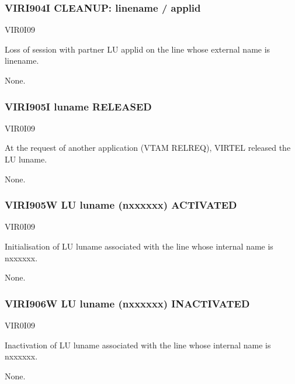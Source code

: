 \documentclass[letterpaper,10pt,english]{sphinxmanual}
\begin{document}
\subsubsection{VIRI904I CLEANUP: linename / applid}
\label{\detokenize{messages:viri904i-cleanup-linename-applid}}\begin{description}
\sphinxAtStartPar
VIR0I09

\sphinxAtStartPar
Loss of session with partner LU applid on the line whose external name is linename.

\sphinxAtStartPar
None.

\end{description}


\subsubsection{VIRI905I luname RELEASED}
\label{\detokenize{messages:viri905i-luname-released}}\begin{description}
\sphinxAtStartPar
VIR0I09

\sphinxAtStartPar
At the request of another application (VTAM RELREQ), VIRTEL released the LU luname.

\sphinxAtStartPar
None.

\end{description}


\subsubsection{VIRI905W LU luname (n\sphinxhyphen{}xxxxxx) ACTIVATED}
\label{\detokenize{messages:viri905w-lu-luname-n-xxxxxx-activated}}\begin{description}
\sphinxAtStartPar
VIR0I09

\sphinxAtStartPar
Initialisation of LU luname associated with the line whose internal name is n\sphinxhyphen{}xxxxxx.

\sphinxAtStartPar
None.

\end{description}


\subsubsection{VIRI906W LU luname (n\sphinxhyphen{}xxxxxx) INACTIVATED}
\label{\detokenize{messages:viri906w-lu-luname-n-xxxxxx-inactivated}}\begin{description}
\sphinxAtStartPar
VIR0I09

\sphinxAtStartPar
Inactivation of LU luname associated with the line whose internal name is n\sphinxhyphen{}xxxxxx.

\sphinxAtStartPar
None.

\end{description}
\end{document}
